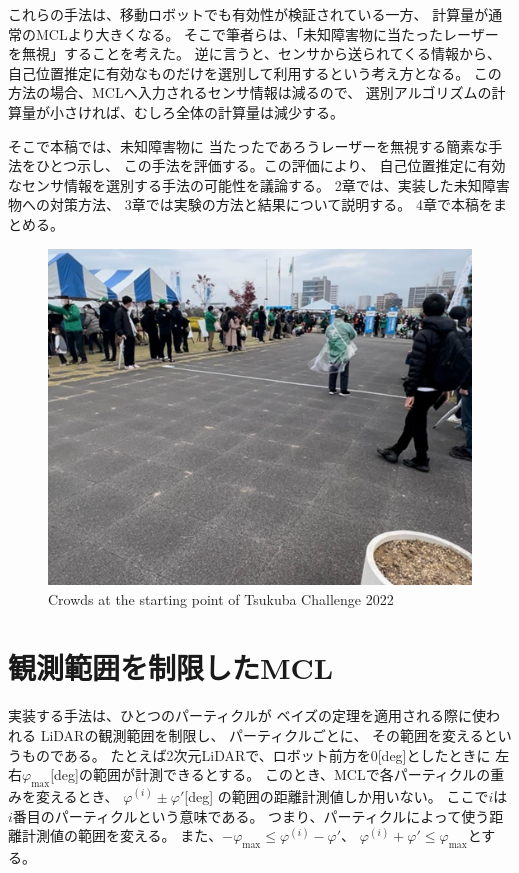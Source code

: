 \documentclass{jarticle}
\begin{document}
これらの手法は、移動ロボットでも有効性が検証されている一方、
計算量が通常のMCLより大きくなる。
そこで筆者らは、「未知障害物に当たったレーザーを無視」することを考えた。
逆に言うと、センサから送られてくる情報から、
自己位置推定に有効なものだけを選別して利用するという考え方となる。
この方法の場合、MCLへ入力されるセンサ情報は減るので、
選別アルゴリズムの計算量が小さければ、むしろ全体の計算量は減少する。

そこで本稿では、未知障害物に
当たったであろうレーザーを無視する簡素な手法をひとつ示し、
この手法を評価する。この評価により、
自己位置推定に有効なセンサ情報を選別する手法の可能性を議論する。
2章では、実装した未知障害物への対策方法、
3章では実験の方法と結果について説明する。
4章で本稿をまとめる。

\begin{figure}[bth]
  \centering
	\includegraphics[width=0.8\linewidth]{fig/hitogomi.png}
   \caption{Crowds at the starting point of Tsukuba Challenge 2022}
   \label{fig:つくばチャレンジ人混み}
 \end{figure}

\section{観測範囲を制限したMCL}%

実装する手法は、ひとつのパーティクルが
ベイズの定理を適用される際に使われる
LiDARの観測範囲を制限し、
パーティクルごとに、
その範囲を変えるというものである。
たとえば2次元LiDARで、ロボット前方を$0$[deg]としたときに
左右$\varphi_\text{max}$[deg]の範囲が計測できるとする。
このとき、MCLで各パーティクルの重みを変えるとき、
$\varphi^{(i)} \pm \varphi'$[deg]
の範囲の距離計測値しか用いない。
ここで$i$は$i$番目のパーティクルという意味である。
つまり、パーティクルによって使う距離計測値の範囲を変える。
また、$ -\varphi_\text{max} \le \varphi^{(i)}-\varphi'$、
$\varphi^{(i)}+\varphi' \le \varphi_\text{max}$とする。
\end{document}

